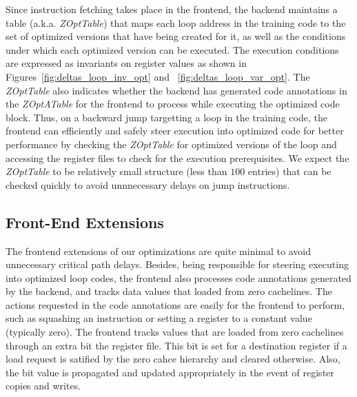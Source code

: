   Since instruction fetching takes place in the frontend, the backend maintains a table (a.k.a. {\it ZOptTable}) that maps each loop address in the training code to the set of optimized versions that have being created for it, as well as the conditions under which each optimized version can be executed.   The execution conditions are expressed as invariants on register values as shown in Figures~\ref{fig:deltas_loop_inv_opt} and ~\ref{fig:deltas_loop_var_opt}.  The {\it ZOptTable} also indicates whether the backend has generated code annotations in the {\it ZOptATable} for the frontend to process while executing the optimized code block.  Thus, on a backward jump targetting a loop in the training code, the frontend can efficiently and safely steer execution into optimized code for better performance by checking  the {\it ZOptTable} for optimized versions of the loop and accessing the register files to check for the execution prerequisites.   We expect the {\it ZOptTable} to be relatively small structure (less than $100$ entries) that can be checked quickly to avoid unnnecessary delays on jump instructions.  
    
\subsection{Front-End Extensions}
The frontend extensions of our optimizations are quite minimal to avoid unnecessary critical path delays.  Besides, being responsible for steering executing into optimized loop codes, the frontend also processes code annotations generated by the backend, and tracks data values that loaded from zero cachelines.  The actions requested in the code annotations are easily for the frontend to perform, such as squashing an instruction or setting a register to a constant value (typically zero).   The frontend tracks values that are loaded from zero cachelines through an extra bit the register file.  This bit is set for a destination register if a load request is satified by the zero cahce hierarchy and cleared otherwise.  Also, the bit value is propagated and updated appropriately in the event of register copies and writes. 